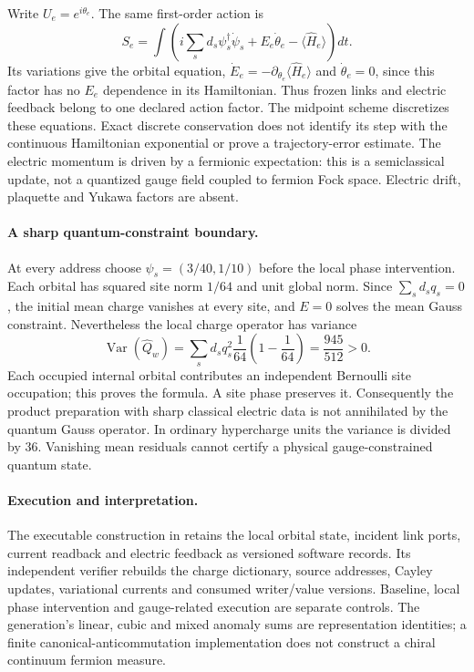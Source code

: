 Write $U_e=e^{i\theta_e}$. The same first-order action is
\[
 S_e=\int\left(i\sum_s d_s\psi_s^\dagger\dot\psi_s
       +E_e\dot\theta_e-\langle\widehat H_e\rangle\right)dt.
\]
Its variations give the orbital equation, $\dot E_e=-\partial_{\theta_e}
\langle\widehat H_e\rangle$ and $\dot\theta_e=0$, since this factor has no
$E_e$ dependence in its Hamiltonian. Thus frozen links and electric feedback
belong to one declared action factor. The midpoint scheme discretizes
these equations. Exact discrete conservation does not identify its step
with the continuous Hamiltonian exponential or prove a trajectory-error
estimate. The electric momentum is driven by a fermionic expectation:
this is a semiclassical update, not a quantized gauge field coupled to
fermion Fock space. Electric drift, plaquette and Yukawa factors are absent.

\paragraph{A sharp quantum-constraint boundary.}
At every address choose $\psi_s=(3/40,1/10)$ before the local phase
intervention. Each orbital has squared site norm $1/64$ and unit global
norm. Since $\sum_s d_sq_s=0$, the initial mean charge vanishes at every
site, and $E=0$ solves the mean Gauss constraint. Nevertheless the local
charge operator has variance
\begin{equation}
 \operatorname{Var}(\widehat Q_w)
 =\sum_s d_sq_s^2\frac1{64}\left(1-\frac1{64}\right)
 =\frac{945}{512}>0.
 \label{eq:fermion-source-gauss-variance}
\end{equation}
Each occupied internal orbital contributes an independent Bernoulli site
occupation; this proves the formula. A site phase preserves it. Consequently
the product preparation with sharp classical electric data is not
annihilated by the quantum Gauss operator. In ordinary hypercharge units
the variance is divided by $36$. Vanishing mean residuals cannot certify
a physical gauge-constrained quantum state.

\paragraph{Execution and interpretation.}
The executable construction in  retains
the local orbital state, incident link ports, current readback and electric
feedback as versioned software records. Its independent verifier rebuilds
the charge dictionary, source addresses, Cayley updates, variational
currents and consumed writer/value versions. Baseline, local phase
intervention and gauge-related execution are separate controls. The
generation's linear, cubic and mixed anomaly sums are representation
identities; a finite canonical-anticommutation implementation does not
construct a chiral continuum fermion measure.


